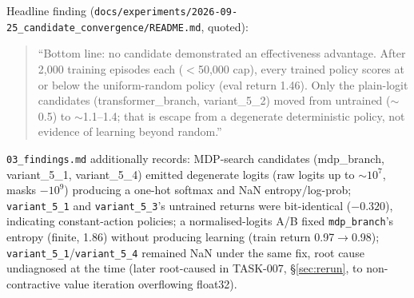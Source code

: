 \documentclass[11pt]{article}
\newcommand{\srcpath}[1]{\texttt{\small #1}}
\begin{document}
Headline finding (\srcpath{docs/experiments/2026-09-25\_candidate\_convergence/README.md}, quoted):
\begin{quote}\small
``Bottom line: no candidate demonstrated an effectiveness advantage. After 2{,}000 training
episodes each ($<$50{,}000 cap), every trained policy scores at or below the uniform-random policy
(eval return 1.46). Only the plain-logit candidates (transformer\_branch, variant\_5\_2) moved from
untrained ($\sim$0.5) to $\sim$1.1--1.4; that is escape from a degenerate deterministic policy, not
evidence of learning beyond random.''
\end{quote}
\srcpath{03\_findings.md} additionally records: MDP-search candidates (mdp\_branch, variant\_5\_1,
variant\_5\_4) emitted degenerate logits (raw logits up to $\sim 10^7$, masks $-10^9$) producing a
one-hot softmax and NaN entropy/log-prob; \texttt{variant\_5\_1} and \texttt{variant\_5\_3}'s
untrained returns were bit-identical ($-0.320$), indicating constant-action policies; a
normalised-logits A/B fixed \texttt{mdp\_branch}'s entropy (finite, 1.86) without producing learning
(train return 0.97$\to$0.98); \texttt{variant\_5\_1}/\texttt{variant\_5\_4} remained NaN under the
same fix, root cause undiagnosed at the time (later root-caused in TASK-007, \S\ref{sec:rerun}, to
non-contractive value iteration overflowing float32).
\end{document}
